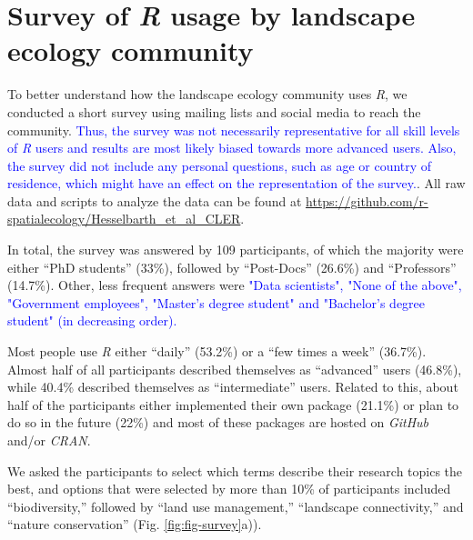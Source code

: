\documentclass[smallextended]{svjour3}       %
\begin{document}
\begin{table}
\begin{tabularx}{1.35\linewidth}{lrXr}
\end{tabularx}

\label{tab:packages}

\end{table}

\FloatBarrier

\hypertarget{survey-of-usage-by-landscape-ecology-community}{%
\section{\texorpdfstring{Survey of \textit{R} usage by landscape ecology community}{Survey of  usage by landscape ecology community}}\label{survey-of-usage-by-landscape-ecology-community}}

To better understand how the landscape ecology community uses \textit{R}, we conducted a short survey using mailing lists and social media to reach the community. \textcolor{blue}{Thus, the survey was not necessarily representative for all skill levels of \textit{R} users and results are most likely biased towards more advanced users. Also, the survey did not include any personal questions, such as age or country of residence, which might have an effect on the representation of the survey.}.
All raw data and scripts to analyze the data can be found at \url{https://github.com/r-spatialecology/Hesselbarth_et_al_CLER}.

In total, the survey was answered by 109 participants, of which the majority were either ``PhD students'' (33\%), followed by ``Post-Docs'' (26.6\%) and ``Professors'' (14.7\%).
Other, less frequent answers were \textcolor{blue}{"Data scientists", "None of the above", "Government employees", "Master's degree student" and "Bachelor's degree student" (in decreasing order).}

Most people use \textit{R} either ``daily'' (53.2\%) or a ``few times a week'' (36.7\%).
Almost half of all participants described themselves as ``advanced'' users (46.8\%), while 40.4\% described themselves as ``intermediate'' users.
Related to this, about half of the participants either implemented their own package (21.1\%) or plan to do so in the future (22\%) and most of these packages are hosted on \textit{GitHub} and/or \textit{CRAN}.

We asked the participants to select which terms describe their research topics the best, and options that were selected by more than 10\% of participants included ``biodiversity,'' followed by ``land use management,'' ``landscape connectivity,'' and ``nature conservation'' (Fig. \ref{fig:fig-survey}a)).
\end{document}
